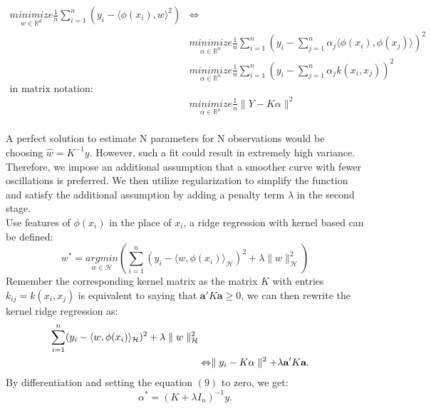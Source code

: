 \begin{align*}
    \underset{w\in\mathbb{R}^d}{minimize}\frac{1}{n}\sum_{i=1}^n(y_i-\langle\phi(x_i),w\rangle^2)&\Leftrightarrow\\
                                                                                     &\underset{\alpha\in\mathbb{R}^n}{minimize}\frac{1}{n}\sum_{i=1}^n(y_i-\sum_{j=1}^n\alpha_j\langle\phi(x_i),\phi(x_j)\rangle)^2\\
                                                                                     &\underset{\alpha\in\mathbb{R}^n}{minimize}\frac{1}{n}\sum_{i=1}^n(y_i-\sum_{j=1}^n\alpha_j k(x_i,x_j))^2\\
                                                        \text{in matrix notation:}\\  &\underset{\alpha\in\mathbb{R}^n}{minimize}\frac{1}{n}\parallel Y-K\alpha\parallel^2
\end{align*}\\ 
A perfect solution to estimate N parameters for N observations would be choosing $\hat{w}=K^{-1}y$. However, such a fit could result in extremely high variance. Therefore, we impose an additional assumption 
that a smoother curve with fewer oscillations is preferred. We then utilize regularization to simplify the function and satisfy the additional assumption by adding a penalty term $\lambda$ in 
the second stage. \\
Use features of $\phi(x_i)$ in the place of $x_i$, a ridge regression with kernel based can be defined:
\begin{equation}
    w^{*}=\underset{w\in\mathcal{H}}{argmin}\left(\sum_{i=1}^n(y_i-\langle w,\phi(x_i)\rangle_\mathcal{H})^2+\lambda\parallel w\parallel_\mathcal{H}^2\right)
\end{equation}
Remember the corresponding kernel matrix as the matrix $K$ with entries $k_{ij}=k(x_i,x_j)$ is equivalent to saying that $\textbf{a}'K \textbf{a}\geq 0$, we can then rewrite the kernel ridge regression as:
\begin{align}
    \sum_{i=1}^n(y_i-\langle w,\phi(x_i)\rangle_\mathcal{H})^2+\lambda\parallel w\parallel_\mathcal{H}^2 \notag\\
    &\Leftrightarrow\parallel y_i-K \alpha\parallel^2+\lambda \textbf{a}' K\textbf{a}.
\end{align}
By differentiation and setting the equation $(9)$ to zero, we get:
\begin{equation}
    \alpha^{*}=(K+\lambda I_n)^{-1}y.
\end{equation}


